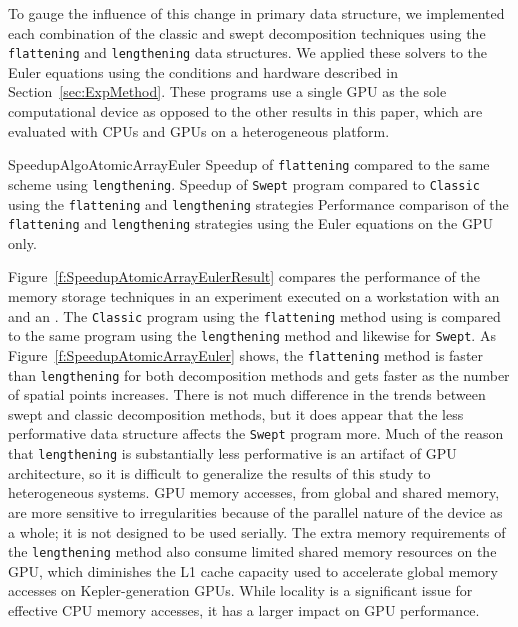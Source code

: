 To gauge the influence of this change in primary data structure, we implemented each combination of the classic and swept decomposition techniques using the \texttt{flattening} and \texttt{lengthening} data structures.
We applied these solvers to the Euler equations using the conditions and hardware described in Section~\ref{sec:ExpMethod}.
These programs use a single GPU as the sole computational device as opposed to the other results in this paper, which are evaluated with CPUs and GPUs on a heterogeneous platform.  

{SpeedupAlgoAtomicArrayEuler}
{Speedup of \texttt{flattening} compared to the same scheme using \texttt{lengthening}.}
{Speedup of \texttt{Swept} program compared to \texttt{Classic} using the \texttt{flattening} and \texttt{lengthening} strategies}
{Performance comparison of the \texttt{flattening} and \texttt{lengthening} strategies using the Euler equations on the GPU only.}


Figure~\ref{f:SpeedupAtomicArrayEulerResult} compares the performance of the memory storage techniques in an
experiment executed on a workstation with an \WCPU{} and an \WGPU{}.
The \texttt{Classic} program using the \texttt{flattening} method using is compared to the same program using the \texttt{lengthening} method and likewise for \texttt{Swept}. %
As Figure~\ref{f:SpeedupAtomicArrayEuler} shows, the \texttt{flattening} method is faster than \texttt{lengthening} for both decomposition methods and gets faster as the number of spatial points increases.
There is not much difference in the trends between swept and classic decomposition methods, but it does appear that the less performative data structure affects the \texttt{Swept} program more.
Much of the reason that \texttt{lengthening} is substantially less performative is an artifact of GPU architecture, so it is difficult to generalize the results of this study to heterogeneous systems. 
GPU memory accesses, from global and shared memory, are more sensitive to irregularities because of the parallel nature of the device as a whole; it is not designed to be used serially.
The extra memory requirements of the \texttt{lengthening} method also consume limited shared memory resources on the GPU, which diminishes the L1 cache capacity used to accelerate global memory accesses on Kepler-generation GPUs.
While locality is a significant issue for effective CPU memory accesses, it has a larger impact on GPU performance.


